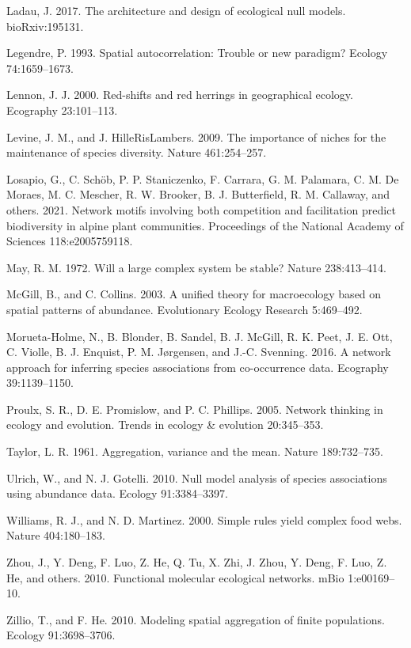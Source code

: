 \documentclass[
  letterpaper,
  DIV=11,
  numbers=noendperiod]{scrartcl}
\newlength{\cslhangindent}
\newenvironment{CSLReferences}[2] %
 {\begin{list}{}{%
  \setlength{\itemindent}{0pt}
  \setlength{\leftmargin}{0pt}
  \setlength{\parsep}{0pt}
  \ifodd #1
   \setlength{\leftmargin}{\cslhangindent}
   \setlength{\itemindent}{-1\cslhangindent}
  \fi
  \setlength{\itemsep}{#2\baselineskip}}}
 {\end{list}}
\begin{document}
\begin{CSLReferences}{1}{0}
Ladau, J. 2017. The architecture and design of ecological null models.
bioRxiv:195131.

Legendre, P. 1993. Spatial autocorrelation: Trouble or new paradigm?
Ecology 74:1659--1673.

Lennon, J. J. 2000. Red-shifts and red herrings in geographical ecology.
Ecography 23:101--113.

Levine, J. M., and J. HilleRisLambers. 2009. The importance of niches
for the maintenance of species diversity. Nature 461:254--257.

Losapio, G., C. Schöb, P. P. Staniczenko, F. Carrara, G. M. Palamara, C.
M. De Moraes, M. C. Mescher, R. W. Brooker, B. J. Butterfield, R. M.
Callaway, and others. 2021. Network motifs involving both competition
and facilitation predict biodiversity in alpine plant communities.
Proceedings of the National Academy of Sciences 118:e2005759118.

May, R. M. 1972. Will a large complex system be stable? Nature
238:413--414.

McGill, B., and C. Collins. 2003. A unified theory for macroecology
based on spatial patterns of abundance. Evolutionary Ecology Research
5:469--492.

Morueta-Holme, N., B. Blonder, B. Sandel, B. J. McGill, R. K. Peet, J.
E. Ott, C. Violle, B. J. Enquist, P. M. Jørgensen, and J.-C. Svenning.
2016. A network approach for inferring species associations from
co-occurrence data. Ecography 39:1139--1150.

Proulx, S. R., D. E. Promislow, and P. C. Phillips. 2005. Network
thinking in ecology and evolution. Trends in ecology \& evolution
20:345--353.

Taylor, L. R. 1961. Aggregation, variance and the mean. Nature
189:732--735.

Ulrich, W., and N. J. Gotelli. 2010. Null model analysis of species
associations using abundance data. Ecology 91:3384--3397.

Williams, R. J., and N. D. Martinez. 2000. Simple rules yield complex
food webs. Nature 404:180--183.

Zhou, J., Y. Deng, F. Luo, Z. He, Q. Tu, X. Zhi, J. Zhou, Y. Deng, F.
Luo, Z. He, and others. 2010. Functional molecular ecological networks.
mBio 1:e00169--10.

Zillio, T., and F. He. 2010. Modeling spatial aggregation of finite
populations. Ecology 91:3698--3706.

\end{CSLReferences}
\end{document}
